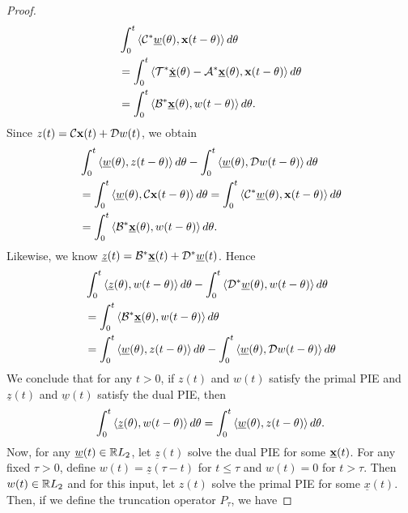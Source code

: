 \begin{proof}
\begin{equation*}
\begin{aligned}
            &\int_0^t\left\langle \mathcal{C}^*\underline{w}(\theta), \mathbf{x}(t-\theta) \right\rangle d\theta\\
            &=\int_0^t\left\langle \mathcal{T}^*\dot{\underline{\mathbf{x}}}(\theta)-\mathcal{A}^*\underline{\mathbf{x}}(\theta), \mathbf{x}(t-\theta) \right\rangle d\theta\\
            &=\int_0^t\left\langle \mathcal{B}^*\underline{\mathbf{x}}(\theta), w(t-\theta) \right\rangle d\theta.
        \end{aligned}
    \end{equation*}
    Since $z(t) = \mathcal{C}\mathbf{x}(t) + \mathcal{D}w(t)$, we obtain
    \begin{equation*}
        \begin{aligned}
            &\int_0^t\left\langle \underline{w}(\theta), z(t-\theta) \right\rangle d\theta - \int_0^t\left\langle \underline{w}(\theta), \mathcal{D}w(t-\theta) \right\rangle d\theta\\
            &=\int_0^t\left\langle \underline{w}(\theta), \mathcal{C}\mathbf{x}(t-\theta) \right\rangle d\theta = \int_0^t\left\langle \mathcal{C}^*\underline{w}(\theta), \mathbf{x}(t-\theta) \right\rangle d\theta\\
            &=\int_0^t\left\langle \mathcal{B}^*\underline{\mathbf{x}}(\theta), w(t-\theta) \right\rangle d\theta.
        \end{aligned}
    \end{equation*}
    Likewise, we know $\underline{z}(t) = \mathcal{B}^*\underline{\mathbf{x}}(t) +\mathcal{D}^*\underline{w}(t)$. Hence
    \begin{equation*}
        \begin{aligned}
            &\int_0^t\left\langle \underline{z}(\theta), w(t-\theta) \right\rangle d\theta - \int_0^t\left\langle \mathcal{D}^*\underline{w}(\theta), w(t-\theta) \right\rangle d\theta\\
            &= \int_0^t\left\langle \mathcal{B}^*\underline{\mathbf{x}}(\theta), w(t-\theta) \right\rangle d\theta\\
            &= \int_0^t\left\langle \underline{w}(\theta), z(t-\theta) \right\rangle d\theta - \int_0^t\left\langle \underline{w}(\theta), \mathcal{D}w(t-\theta) \right\rangle d\theta
        \end{aligned}
    \end{equation*}
    We conclude that for any $t>0$, if $z(t)$ and $w(t)$ satisfy the primal PIE and $\underline{z}(t)$ and $\underline{w}(t)$ satisfy the dual PIE, then
    \begin{equation}\label{eqn:equivalence}
        \int_0^t\left\langle \underline{z}(\theta), w(t-\theta) \right\rangle d\theta = \int_0^t\left\langle \underline{w}(\theta), z(t-\theta) \right\rangle d\theta.
    \end{equation}
    Now, for any $\underline{w}(t)\in\mathbb{R} L_2$, let $\underline{z}(t)$ solve the dual PIE for some $\underline{\mathbf{x}}(t)$. For any fixed $\tau>0$, define $w(t) = \underline{z}(\tau-t)$ for $t\leq \tau$ and $w(t) = 0$ for $t>\tau$. Then $w(t) \in \mathbb{R} L_2$ and for this input, let $z(t)$ solve the primal PIE for some $\underline{x}(t)$. Then, if we define the truncation operator $P_\tau$, we have

\end{proof}

